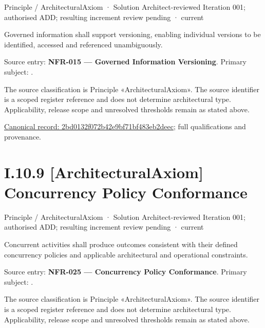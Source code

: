 \label{element:2bd0132f072b42e9bf71bf483eb2deec}
{\small Principle / ArchitecturalAxiom · Solution Architect-reviewed Iteration 001; authorised ADD; resulting increment review pending · current}\par

Governed information shall support versioning, enabling individual versions to be identified, accessed and referenced unambiguously.



Source entry: \textbf{NFR-015 — Governed Information Versioning}. Primary subject: \texttt{}.



The source classification is Principle «ArchitecturalAxiom». The source identifier is a scoped register reference and does not determine architectural type. Applicability, release scope and unresolved thresholds remain as stated above.


{\footnotesize \href{../../../../continuum/motivation/principle/architectural-axiom/2bd0132f072b42e9bf71bf483eb2deec.md}{Canonical record: 2bd0132f072b42e9bf71bf483eb2deec}; full qualifications and provenance.}\par
\section*{I.10.9 [ArchitecturalAxiom] Concurrency Policy Conformance}
\label{navigation:I.10.9}

\label{element:7e3b05a2e3e547cbbd26b1e181af0d10}
{\small Principle / ArchitecturalAxiom · Solution Architect-reviewed Iteration 001; authorised ADD; resulting increment review pending · current}\par

Concurrent activities shall produce outcomes consistent with their defined concurrency policies and applicable architectural and operational constraints.



Source entry: \textbf{NFR-025 — Concurrency Policy Conformance}. Primary subject: \texttt{}.



The source classification is Principle «ArchitecturalAxiom». The source identifier is a scoped register reference and does not determine architectural type. Applicability, release scope and unresolved thresholds remain as stated above.


